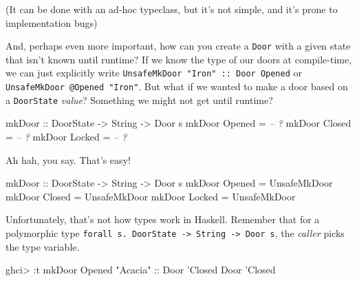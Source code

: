 \documentclass[]{article}
\newenvironment{Shaded}{}{}
\newcommand{\CommentTok}[1]{\textcolor[rgb]{0.38,0.63,0.69}{\textit{#1}}}
\newcommand{\DataTypeTok}[1]{\textcolor[rgb]{0.56,0.13,0.00}{#1}}
\newcommand{\FunctionTok}[1]{\textcolor[rgb]{0.02,0.16,0.49}{#1}}
\newcommand{\NormalTok}[1]{#1}
\newcommand{\OtherTok}[1]{\textcolor[rgb]{0.00,0.44,0.13}{#1}}
\newcommand{\StringTok}[1]{\textcolor[rgb]{0.25,0.44,0.63}{#1}}
\begin{document}
(It can be done with an ad-hoc typeclass, but it's not simple, and it's prone to
implementation bugs)

And, perhaps even more important, how can you create a \texttt{Door} with a
given state that isn't known until runtime? If we know the type of our doors at
compile-time, we can just explicitly write
\texttt{UnsafeMkDoor\ "Iron"\ ::\ Door\ \textquotesingle{}Opened} or
\texttt{UnsafeMkDoor\ @\textquotesingle{}Opened\ "Iron"}. But what if we wanted
to make a door based on a \texttt{DoorState} \emph{value}? Something we might
not get until runtime?

\begin{Shaded}
\begin{Highlighting}[]
\OtherTok{mkDoor ::} \DataTypeTok{DoorState} \OtherTok{->} \DataTypeTok{String} \OtherTok{->} \DataTypeTok{Door}\NormalTok{ s}
\NormalTok{mkDoor }\DataTypeTok{Opened} \FunctionTok{=} \CommentTok{-- ?}
\NormalTok{mkDoor }\DataTypeTok{Closed} \FunctionTok{=} \CommentTok{-- ?}
\NormalTok{mkDoor }\DataTypeTok{Locked} \FunctionTok{=} \CommentTok{-- ?}
\end{Highlighting}
\end{Shaded}

Ah hah, you say. That's easy!

\begin{Shaded}
\begin{Highlighting}[]
\OtherTok{mkDoor ::} \DataTypeTok{DoorState} \OtherTok{->} \DataTypeTok{String} \OtherTok{->} \DataTypeTok{Door}\NormalTok{ s}
\NormalTok{mkDoor }\DataTypeTok{Opened} \FunctionTok{=} \DataTypeTok{UnsafeMkDoor}
\NormalTok{mkDoor }\DataTypeTok{Closed} \FunctionTok{=} \DataTypeTok{UnsafeMkDoor}
\NormalTok{mkDoor }\DataTypeTok{Locked} \FunctionTok{=} \DataTypeTok{UnsafeMkDoor}
\end{Highlighting}
\end{Shaded}

Unfortunately, that's not how types work in Haskell. Remember that for a
polymorphic type
\texttt{forall\ s.\ DoorState\ -\textgreater{}\ String\ -\textgreater{}\ Door\ s},
the \emph{caller} picks the type variable.

\begin{Shaded}
\begin{Highlighting}[]
\NormalTok{ghci}\FunctionTok{>} \FunctionTok{:}\NormalTok{t mkDoor }\DataTypeTok{Opened} \StringTok{"Acacia"}\OtherTok{ ::} \DataTypeTok{Door}\NormalTok{ '}\DataTypeTok{Closed}
\DataTypeTok{Door}\NormalTok{ '}\DataTypeTok{Closed}
\end{Highlighting}
\end{Shaded}
\end{document}
